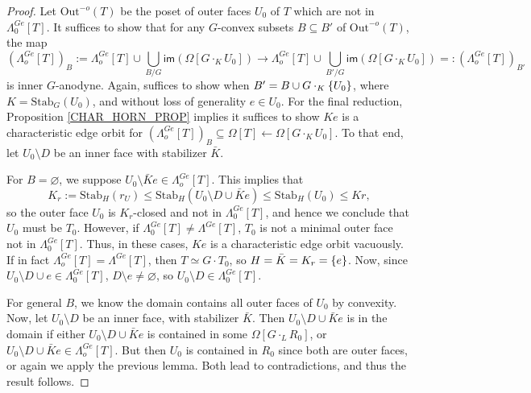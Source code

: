 \documentclass[a4paper,10p,draft]{article}%
\numberwithin{equation}{section}%
\begin{document}
\begin{proof}
      Let $\mathrm{Out}^{-o}(T)$ be the poset of outer faces $U_0$ of $T$ which are not in $\Lambda_0^{Ge}[T]$.
      It suffices to show that for any $G$-convex subsets $B \subseteq B'$ of $\mathrm{Out}^{-o}(T)$, the map
      \begin{equation}
            \left(\Lambda^{G e}_{o}[T]\right)_B
            := \Lambda_o^{Ge}[T] \cup \mathop{\bigcup}\limits_{B/G}\mathsf{im}\left(\Omega[G \cdot_K U_0]\right)
            \to
            \Lambda_o^{Ge}[T] \cup \mathop{\bigcup}\limits_{B'/G}\mathsf{im}\left(\Omega[G \cdot_K U_0]\right)
            =: (\Lambda^{G e}_o[T])_{B'}
      \end{equation}
      is inner $G$-anodyne.
      Again, suffices to show when $B' = B \cup G \cdot_K \left\{U_0\right\}$, where $K = \mathrm{Stab}_G(U_0)$, and
      without loss of generality $e \in U_0$.
      For the final reduction, Proposition \ref{CHAR_HORN_PROP} implies it suffices to show
      $K e$ is a characteristic edge orbit for
      $(\Lambda^{G e}_o[T])_B \subseteq \Omega[T] \leftarrow \Omega[G \cdot_K U_0]$.
      To that end, let $U_0 \setminus D$ be an inner face with stabilizer $\bar K$.
      
      For $B = \varnothing$, we suppose $U_0 \setminus \bar K e \in \Lambda_o^{G e}[T]$. This implies that
      \begin{equation}
            K_r := \mathrm{Stab}_H(r_U) \leq \mathrm{Stab}_H(U_0 \setminus D \cup \bar K e) \leq \mathrm{Stab}_H(U_0) \leq Kr,
      \end{equation}
      so the outer face $U_0$ is $K_r$-closed and not in $\Lambda_0^{Ge}[T]$, and hence we conclude that $U_0$ must be $T_0$.
      However, if $\Lambda^{Ge}_0[T] \neq \Lambda^{Ge}[T]$, $T_0$ is not a minimal outer face not in $\Lambda_0^{Ge}[T]$.
      Thus, in these cases, $K e$ is a characteristic edge orbit vacuously.
      If in fact $\Lambda_o^{Ge}[T] = \Lambda^{Ge}[T]$, then $T \simeq G \cdot T_0$, so $H = \bar K = K_r = \left\{e\right\}$.
      Now, since $U_0 \setminus D \cup e \in \Lambda_0^{Ge}[T]$,
      $D \setminus e \neq \varnothing$, so
      $U_0 \setminus D \in \Lambda_0^{Ge}[T]$.
      
      For general $B$, we know the domain contains all outer faces of $U_0$ by convexity.
      Now, let $U_0 \setminus D$ be an inner face, with stabilizer $\bar K$.
      Then $U_0 \setminus D \cup \bar K e$ is in the domain if either
      $U_0 \setminus D \cup \bar K e$ is contained in some $\Omega[G \cdot_L R_0]$, or
      $U_0 \setminus D \cup \bar K e \in \Lambda_o^{Ge}[T]$.
      But then $U_0$ is contained in $R_0$ since both are outer faces, or again we apply the previous lemma.
      Both lead to contradictions, and thus the result follows.
\end{proof}
\end{document}
